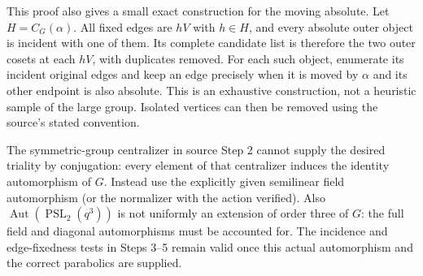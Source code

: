 \documentclass[11pt,a4paper]{article}
\newcommand{\PSL}{\operatorname{PSL}}
\begin{document}
This proof also gives a small exact construction for the moving absolute.
Let $H=C_G(\alpha)$. All fixed edges are $hV$ with $h\in H$, and every
absolute outer object is incident with one of them. Its complete candidate
list is therefore the two outer cosets at each $hV$, with duplicates removed.
For each such object, enumerate its incident original edges and keep an
edge precisely when it is moved by $\alpha$ and its other endpoint is also
absolute. This is an exhaustive construction, not a heuristic sample of
the large group. Isolated vertices can then be removed using the source's
stated convention.

The symmetric-group centralizer in source Step 2 cannot supply the desired
triality by conjugation: every element of that centralizer induces the
identity automorphism of $G$. Instead use the explicitly given semilinear
field automorphism (or the normalizer with the action verified). Also
$\operatorname{Aut}(\PSL_2(q^3))$ is not uniformly an extension of order
three of $G$: the full field and diagonal automorphisms must be accounted
for. The incidence and edge-fixedness tests in Steps 3--5 remain valid
once this actual automorphism and the correct parabolics are supplied.
\end{document}
